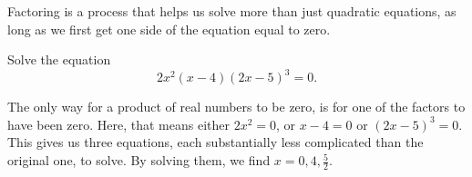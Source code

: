 \documentclass{ximera}
\begin{document}
Factoring is a process that helps us solve more than just quadratic equations, as long as we first get one side of the equation equal to zero.
\begin{example}
	Solve the equation
	\[ 2x^2 \left( x-4 \right) \left( 2x-5\right)^3 = 0. \]
	\begin{explanation}
		The only way for a product of real numbers to be zero, is for one of the factors to have been zero.
		Here, that means either $2x^2 = 0$, or $x-4 = 0$ or $(2x-5)^3 = 0$.
		This gives us three equations, each substantially less complicated than the original one, to solve.  By solving them, we find
		$x = 0, 4, \frac{5}{2}$.
	\end{explanation}
\end{example}
\end{document}
